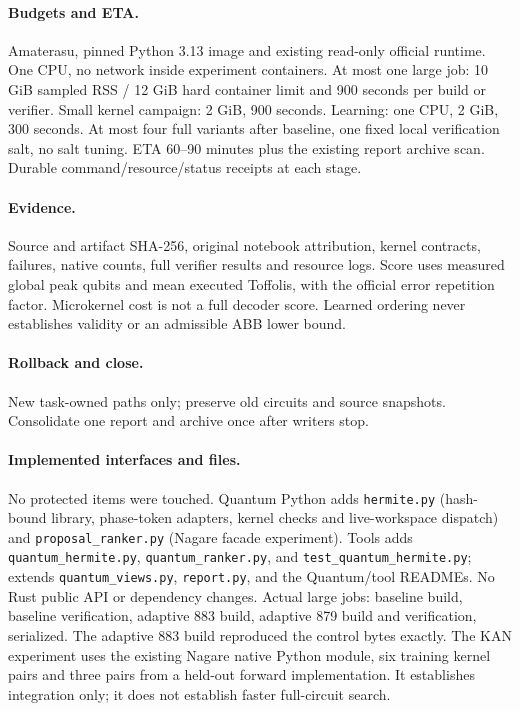 \documentclass{article}
\begin{document}
\paragraph{Budgets and ETA.} Amaterasu, pinned Python 3.13 image and existing
read-only official runtime. One CPU, no network inside experiment containers.
At most one large job: 10 GiB sampled RSS / 12 GiB hard container limit and
900 seconds per build or verifier. Small kernel campaign: 2 GiB, 900 seconds.
Learning: one CPU, 2 GiB, 300 seconds. At most four full variants after baseline,
one fixed local verification salt, no salt tuning. ETA 60--90 minutes plus the
existing report archive scan. Durable command/resource/status receipts at each stage.
\paragraph{Evidence.} Source and artifact SHA-256, original notebook attribution,
kernel contracts, failures, native counts, full verifier results and resource logs.
Score uses measured global peak qubits and mean executed Toffolis, with the official
error repetition factor. Microkernel cost is not a full decoder score. Learned
ordering never establishes validity or an admissible ABB lower bound.
\paragraph{Rollback and close.} New task-owned paths only; preserve old circuits
and source snapshots. Consolidate one report and archive once after writers stop.
\paragraph{Implemented interfaces and files.} No protected items were touched.
Quantum Python adds \texttt{hermite.py} (hash-bound library, phase-token adapters,
kernel checks and live-workspace dispatch) and \texttt{proposal\_ranker.py}
(Nagare facade experiment). Tools adds \texttt{quantum\_hermite.py},
\texttt{quantum\_ranker.py}, and \texttt{test\_quantum\_hermite.py}; extends
\texttt{quantum\_views.py}, \texttt{report.py}, and the Quantum/tool READMEs.
No Rust public API or dependency changes. Actual large jobs: baseline build,
baseline verification, adaptive 883 build, adaptive 879 build and verification,
serialized. The adaptive 883 build reproduced the control bytes exactly.
The KAN experiment uses the existing Nagare native Python module, six training
kernel pairs and three pairs from a held-out forward implementation. It establishes
integration only; it does not establish faster full-circuit search.
\begin{center}\end{center}
\end{document}
